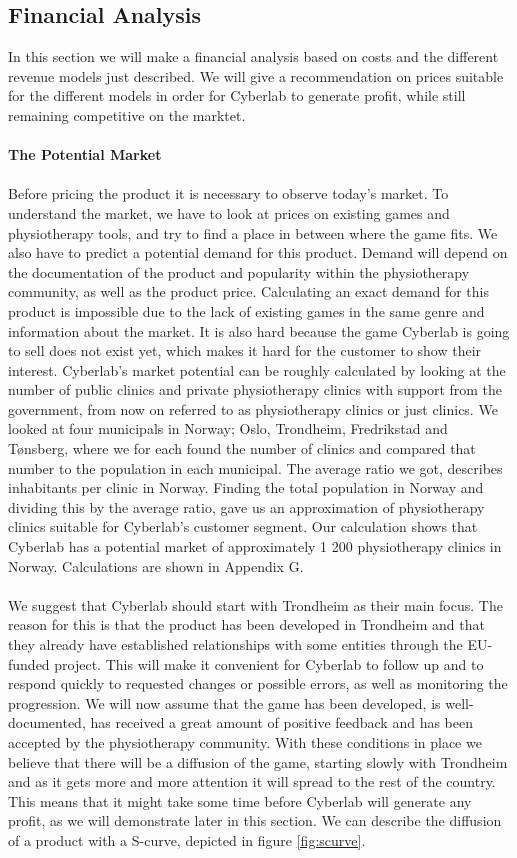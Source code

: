 \subsection{Financial Analysis}
In this section we will make a financial analysis based on costs and the different revenue models just described. We will give a recommendation on prices suitable for the different models in order for Cyberlab to generate profit, while still remaining competitive on the marktet. \\ \\
\textbf{The Potential Market} \\ \\
Before pricing the product it is necessary to observe today's market. To understand the market, we have to look at prices on existing games and physiotherapy tools, and try to find a place in between where the game fits. We also have to predict a potential demand for this product. Demand will depend on the documentation of the product and popularity within the physiotherapy community, as well as the product price. Calculating an exact demand for this product is impossible due to the lack of existing games in the same genre and information about the market. It is also hard because the game Cyberlab is going to sell does not exist yet, which makes it hard for the customer to show their interest. Cyberlab’s market potential can be roughly calculated by looking at the number of public clinics and private physiotherapy clinics with support from the government, from now on referred to as physiotherapy clinics or just clinics. We looked at four municipals in Norway; Oslo, Trondheim, Fredrikstad and T{ø}nsberg, where we for each found the number of clinics and compared that number to the population in each municipal. The average ratio we got, describes inhabitants per clinic in Norway. Finding the total population in Norway and dividing this by the average ratio, gave us an approximation of physiotherapy clinics suitable for Cyberlab's customer segment. Our calculation shows that Cyberlab has a potential market of approximately 1 200 physiotherapy clinics in Norway. Calculations are shown in Appendix G.\\ \\
We suggest that Cyberlab should start with Trondheim as their main focus. The reason for this is that the product has been developed in Trondheim and that they already have established relationships with some entities through the EU- funded project. This will make it convenient for Cyberlab to follow up and to respond quickly to requested changes or possible errors, as well as monitoring the progression. We will now assume that the game has been developed, is well-documented, has received a great amount of positive feedback and has been accepted by the physiotherapy community. With these conditions in place we believe that there will be a diffusion of the game, starting slowly with Trondheim and as it gets more and more attention it will spread to the rest of the country. This means that it might take some time before Cyberlab will generate any profit, as we will demonstrate later in this section. We can describe the diffusion of a product with a S-curve, depicted in figure \ref{fig:scurve}. \\ \\
